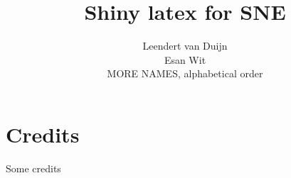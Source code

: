 \documentclass[a4paper,11pt] {article}
\title{Shiny latex for SNE}
\author{
Leendert van Duijn\\
Esan Wit\\
MORE NAMES, alphabetical order\\}
\begin{document}
\maketitle
\newpage







\appendix
\section{Credits}
Some credits
\end{document}
